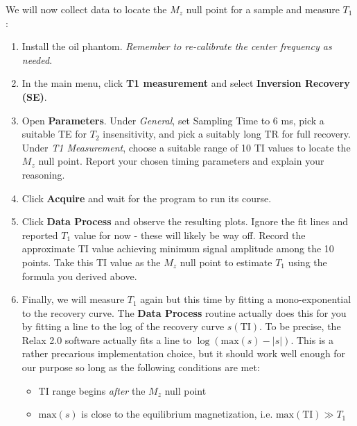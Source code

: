 We will now collect data to locate the $M_z$ null point for a sample and measure $T_1$:
\begin{enumerate}
    \item   Install the oil phantom. \emph{Remember to re-calibrate the center frequency as needed}.
    \item   In the main menu, click \textbf{T1 measurement} and select \textbf{Inversion Recovery (SE)}.
    \item   Open \textbf{Parameters}. Under \emph{General}, set Sampling Time to 6 ms, pick a suitable TE for $T_2$ insensitivity, and pick a suitably long TR for full recovery. Under \emph{T1 Measurement}, choose a suitable range of 10 TI values to locate the $M_z$ null point.
    \newline
    \color{red} Report your chosen timing parameters and explain your reasoning.
    \color{black}
    \item   Click \textbf{Acquire} and wait for the program to run its course.
    \item   Click \textbf{Data Process} and observe the resulting plots. Ignore the fit lines and reported $T_1$ value for now - these will likely be way off.
    \newline
    \color{red}
    Record the approximate TI value achieving minimum signal amplitude among the 10 points. Take this TI value as the $M_z$ null point to estimate $T_1$ using the formula you derived above.
    \color{black}

    \item Finally, we will measure $T_1$ again but this time by fitting a mono-exponential to the recovery curve. The \textbf{Data Process} routine actually does this for you by fitting a line to the log of the recovery curve $s(\text{TI})$. To be precise, the Relax 2.0 software actually fits a line to $\log{(\text{max}(s)-|s|)}$. This is a rather precarious implementation choice, but it should work well enough for our purpose so long as the following conditions are met:
    \begin{itemize}
        \item TI range begins \emph{after} the $M_z$ null point
        \item $\text{max}(s)$ is close to the equilibrium magnetization, i.e. $\text{max}(\text{TI}) \gg T_1$
    \end{itemize}
    

\end{enumerate}
